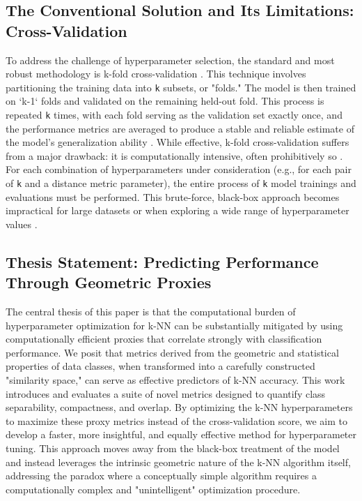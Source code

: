 \documentclass[conference]{IEEEtran}
\begin{document}
\subsection{The Conventional Solution and Its Limitations: Cross-Validation}
To address the challenge of hyperparameter selection, the standard and most robust methodology is k-fold cross-validation \cite{b12, b13, b14}. This technique involves partitioning the training data into \texttt{k} subsets, or "folds." The model is then trained on `k-1` folds and validated on the remaining held-out fold. This process is repeated \texttt{k} times, with each fold serving as the validation set exactly once, and the performance metrics are averaged to produce a stable and reliable estimate of the model's generalization ability \cite{b13, b15}. While effective, k-fold cross-validation suffers from a major drawback: it is computationally intensive, often prohibitively so \cite{b11, b13}. For each combination of hyperparameters under consideration (e.g., for each pair of \texttt{k} and a distance metric parameter), the entire process of \texttt{k} model trainings and evaluations must be performed. This brute-force, black-box approach becomes impractical for large datasets or when exploring a wide range of hyperparameter values \cite{b16, b17}.

\subsection{Thesis Statement: Predicting Performance Through Geometric Proxies}
The central thesis of this paper is that the computational burden of hyperparameter optimization for k-NN can be substantially mitigated by using computationally efficient proxies that correlate strongly with classification performance. We posit that metrics derived from the geometric and statistical properties of data classes, when transformed into a carefully constructed "similarity space," can serve as effective predictors of k-NN accuracy. This work introduces and evaluates a suite of novel metrics designed to quantify class separability, compactness, and overlap. By optimizing the k-NN hyperparameters to maximize these proxy metrics instead of the cross-validation score, we aim to develop a faster, more insightful, and equally effective method for hyperparameter tuning. This approach moves away from the black-box treatment of the model and instead leverages the intrinsic geometric nature of the k-NN algorithm itself, addressing the paradox where a conceptually simple algorithm requires a computationally complex and "unintelligent" optimization procedure.
\end{document}

